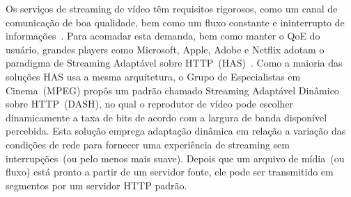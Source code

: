 Os serviços de streaming de vídeo têm requisitos rigorosos, como um canal de comunicação de boa qualidade, bem como um fluxo constante e ininterrupto de informações~\cite{Immich2018WinNet}.
Para acomadar esta demanda, bem como manter o QoE do usuário, grandes players como Microsoft, Apple, Adobe e Netflix adotam o paradigma de Streaming Adaptável sobre HTTP~(HAS)~\cite{company:dashs}. Como a maioria das soluções HAS usa a mesma arquitetura, o Grupo de Especialistas em Cinema~(MPEG) propôs um padrão chamado Streaming Adaptável Dinâmico sobre HTTP~(DASH), no qual o reprodutor de vídeo pode escolher dinamicamente a taxa de bits de acordo com a largura de banda disponível percebida.
Esta solução emprega adaptação dinâmica em relação a variação das condições de rede para fornecer uma experiência de streaming sem interrupções~(ou pelo menos mais suave). Depois que um arquivo de mídia~(ou fluxo) está pronto a partir de um servidor fonte, ele pode ser transmitido em segmentos por um servidor HTTP padrão.


